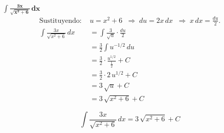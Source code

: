 $\displaystyle \mathbf{\int \frac{3x}{\sqrt{x^{2} + 6}}\,dx}$ 
\nopagebreak
\begin{align*}
\text{Sustituyendo: } &u = x^{2} + 6 
\;\;\Rightarrow\; du = 2x\,dx 
\;\;\Rightarrow\; x\,dx = \frac{du}{2}. \\[6pt]
\int \frac{3x}{\sqrt{x^{2} + 6}}\,dx
&= \int \frac{3}{\sqrt{u}} \cdot \frac{du}{2} \\[6pt]
&= \frac{3}{2} \int u^{-1/2}\,du \\[6pt]
&= \frac{3}{2} \cdot \frac{u^{1/2}}{\tfrac12} + C \\[6pt]
&= \frac{3}{2} \cdot 2\,u^{1/2} + C \\[6pt]
&= 3\,\sqrt{u} + C \\[6pt]
&= 3\,\sqrt{x^{2} + 6} + C
\end{align*}


\[
\boxed{\displaystyle \int \frac{3x}{\sqrt{x^{2} + 6}}\,dx = 3\,\sqrt{x^{2} + 6} + C}
\]

